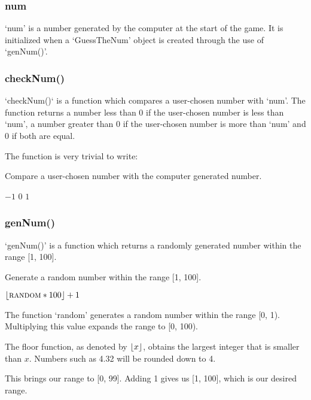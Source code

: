 \documentclass{article}
\DeclarePairedDelimiter{\floor}{\lfloor}{\rfloor}
\begin{document}
\subsubsection{num}

`num' is a number generated by the computer at the start of the game. It is initialized when a `GuessTheNum' object is created through the use of `genNum()'.

\subsubsection{checkNum()}

`checkNum()` is a function which compares a user-chosen number with `num'. The function returns a number less than 0 if the user-chosen number is less than `num', a number greater than 0 if the user-chosen number is more than `num' and 0 if both are equal.

The function is very trivial to write:

\begin{algorithm}
\caption{Compare a user-chosen number with the computer generated number.}

\begin{algorithmic}[1]
    \Return $-1$
    \Return $0$
    \Return $1$
  \EndIf
\EndProcedure
\end{algorithmic}
\end{algorithm}

\subsubsection{genNum()}

`genNum()' is a function which returns a randomly generated number within the range [1, 100].

\begin{algorithm}
\caption{Generate a random number within the range [1, 100].}

\begin{algorithmic}[1]
  \Return $\floor{\Call{random}{} * 100} + 1$
\EndProcedure
\end{algorithmic}
\end{algorithm}

The function `random' generates a random number within the range [0, 1). Multiplying this value expands the range to [0, 100).

The floor function, as denoted by $\floor{x}$, obtains the largest integer that is smaller than $x$. Numbers such as 4.32 will be rounded down to 4.

This brings our range to [0, 99]. Adding 1 gives us [1, 100], which is our desired range.
\end{document}
